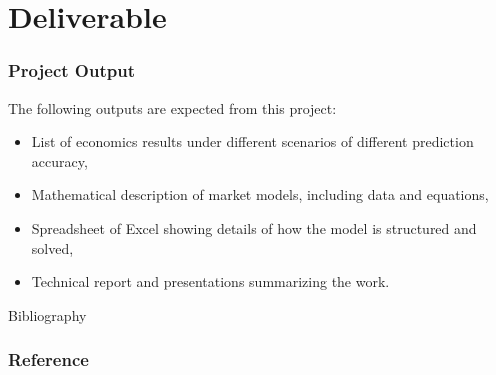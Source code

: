 \documentclass[compress,handout,10pt]{beamer}
\let\olditem\item
\renewcommand{\item}{\setlength{\itemsep}{0.5\baselineskip}\olditem}
\begin{document}
\section{Deliverable}
\begin{frame}
    \frametitle{Project Output}
The following outputs are expected from this project:
\begin{itemize}
    \item List of economics results under different scenarios of different prediction accuracy,
    \item Mathematical description of market models, including data and equations,
    \item Spreadsheet of Excel showing details of how the model is structured and solved,
    \item Technical report and presentations summarizing the work.  
\end{itemize}
\end{frame}

\begin{frame}[allowframebreaks]{Bibliography}
\frametitle{Reference}

\nocite{*}

\end{frame}
\end{document}
